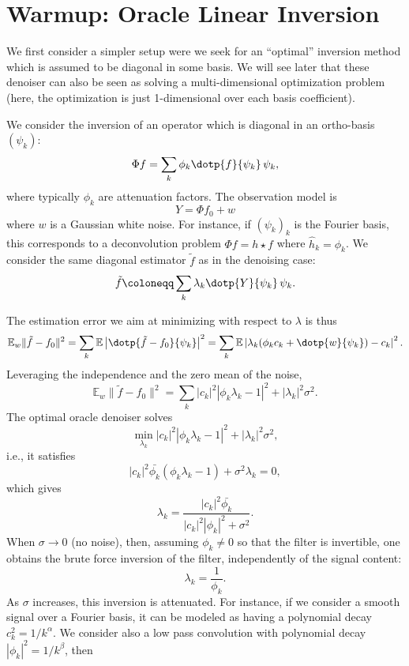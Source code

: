  
\section{Warmup: Oracle Linear Inversion}

We first consider a simpler setup were we seek for an ``optimal'' inversion method which is assumed to be diagonal in some basis. We will see later that these denoiser can also be seen as solving a multi-dimensional optimization problem (here, the optimization is just 1-dimensional over each basis coefficient). 

We consider the inversion of an operator which is diagonal in an ortho-basis $(\psi_k)$:
$$
	\Phi f = \sum_k \phi_k \dotp{f}{\psi_k} \, \psi_k,
$$
where typically $\phi_k$ are attenuation factors. 
%
The observation model is
$$
	Y = \Phi f_0 + w
$$
where $w$ is a Gaussian white noise.
%
For instance, if $(\psi_k)_k$ is the Fourier basis, this corresponds to a deconvolution problem $\Phi f = h \star f$ where $\hat h_k = \phi_k$. We consider the same diagonal estimator $\tilde{f}$ as in the denoising case:
$$
	\tilde{f} \coloneqq \sum_k \lambda_k \dotp{Y}{\psi_k} \, \psi_k.
$$

The estimation error we aim at minimizing with respect to $\lambda$ is thus
$$
	\mathbb{E}_w  \|\tilde{f} - f_0\|^2  = \sum_k \mathbb{E}  \left| \dotp{\tilde{f} - f_0}{\psi_k} \right|^2 = \sum_k \mathbb{E} \left| \lambda_k (\phi_k c_k + \dotp{w}{\psi_k}) - c_k \right|^2 .
$$
Leveraging the independence and the zero mean of the noise,
$$
	\mathbb{E}_w \|\tilde{f} - f_0\|^2 = \sum_k |c_k|^2 | \phi_k \lambda_k - 1 |^2 + |\lambda_k|^2 \sigma^2 .
$$
The optimal oracle denoiser solves
$$
	\min_{\lambda_k} |c_k|^2 | \phi_k \lambda_k - 1 |^2 + |\lambda_k|^2 \sigma^2 ,
$$
i.e., it satisfies
$$
	|c_k|^2 \bar{\phi_k} ( \phi_k \lambda_k - 1 ) + \sigma^2 \lambda_k = 0,
$$
which gives
$$
	\lambda_k = \frac{ |c_k|^2 \bar{\phi_k} }{ |c_k|^2 |\phi_k|^2 + \sigma^2 }.
$$
When $\sigma \to 0$ (no noise), then, assuming $\phi_k \neq 0$ so that the filter is invertible, one obtains the brute force inversion of the filter, independently of the signal content:
$$
	\lambda_k = \frac{1}{\phi_k}.
$$
As $\sigma$ increases, this inversion is attenuated. For instance, if we consider a smooth signal over a Fourier basis, it can be modeled as having a polynomial decay $c_k^2 = 1/k^\alpha$. We consider also a low pass convolution with polynomial decay $|\phi_k|^2 = 1/k^\beta$, then

